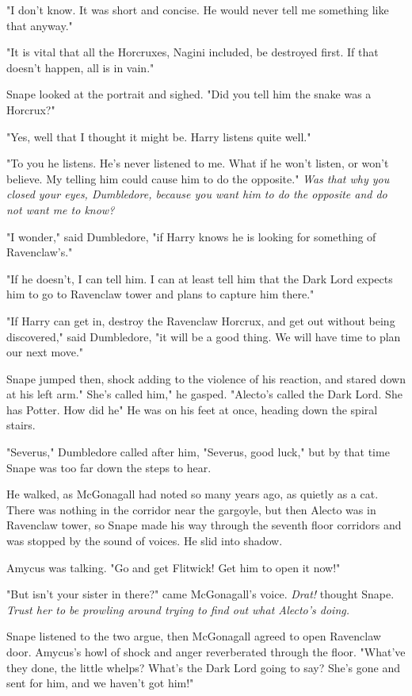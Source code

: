 "I don't know. It was short and concise. He would never tell me something like that anyway."

"It is vital that all the Horcruxes, Nagini included, be destroyed first. If that doesn't happen, all is in vain."

Snape looked at the portrait and sighed. "Did you tell him the snake was a Horcrux?"

"Yes, well that I thought it might be. Harry listens quite well."

"To you he listens. He's never listened to me. What if he won't listen, or won't believe. My telling him could cause him to do the opposite." \emph{Was that why you closed your eyes, Dumbledore, because you want him to do the opposite and do not want me to know?}

"I wonder," said Dumbledore, "if Harry knows he is looking for something of Ravenclaw's."

"If he doesn't, I can tell him. I can at least tell him that the Dark Lord expects him to go to Ravenclaw tower and plans to capture him there."

"If Harry can get in, destroy the Ravenclaw Horcrux, and get out without being discovered," said Dumbledore, "it will be a good thing. We will have time to plan our next move."

Snape jumped then, shock adding to the violence of his reaction, and stared down at his left arm." She's called him," he gasped. "Alecto's called the Dark Lord. She has Potter. How did he{\el}" He was on his feet at once, heading down the spiral stairs.

"Severus," Dumbledore called after him, "Severus, good luck," but by that time Snape was too far down the steps to hear.

He walked, as McGonagall had noted so many years ago, as quietly as a cat. There was nothing in the corridor near the gargoyle, but then Alecto was in Ravenclaw tower, so Snape made his way through the seventh floor corridors and was stopped by the sound of voices. He slid into shadow.

Amycus was talking. "Go and get Flitwick! Get him to open it now!"

"But isn't your sister in there?" came McGonagall's voice. \emph{Drat!} thought Snape. \emph{Trust her to be prowling around trying to find out what Alecto's doing.}

Snape listened to the two argue, then McGonagall agreed to open Ravenclaw door. Amycus's howl of shock and anger reverberated through the floor. "What've they done, the little whelps? What's the Dark Lord going to say? She's gone and sent for him, and we haven't got him!"

